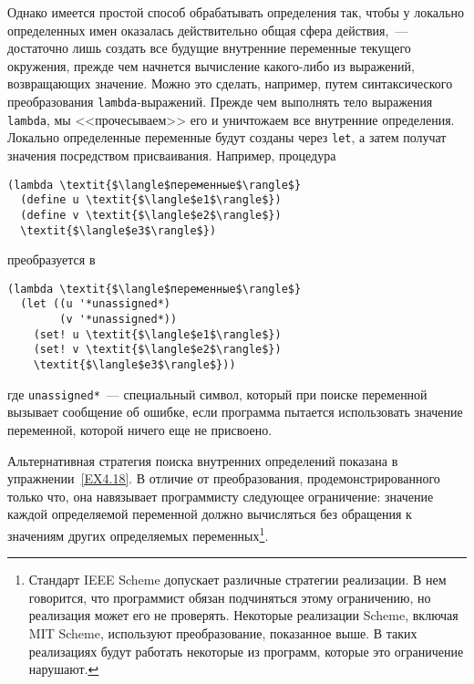 Однако имеется простой способ обрабатывать определения
так, чтобы у локально определенных имен оказалась действительно общая
сфера действия,~--- достаточно лишь создать все будущие внутренние
переменные текущего окружения, прежде чем начнется
вычисление какого-либо из выражений, возвращающих значение.  Можно это
сделать, например, путем синтаксического преобразования
{\tt lambda}-выражений.  Прежде чем выполнять тело выражения
{\tt lambda}, мы 
<<прочесываем>> его и 
уничтожаем все
внутренние определения.  Локально определенные переменные будут
созданы через {\tt let}, а затем получат значения посредством
присваивания.  Например, процедура

\begin{Verbatim}[fontsize=\small]
(lambda \textit{$\langle$переменные$\rangle$}
  (define u \textit{$\langle$e1$\rangle$})
  (define v \textit{$\langle$e2$\rangle$})
  \textit{$\langle$e3$\rangle$})
\end{Verbatim}
преобразуется в

\begin{Verbatim}[fontsize=\small]
(lambda \textit{$\langle$переменные$\rangle$}
  (let ((u '*unassigned*)
        (v '*unassigned*))
    (set! u \textit{$\langle$e1$\rangle$})
    (set! v \textit{$\langle$e2$\rangle$})
    \textit{$\langle$e3$\rangle$}))
\end{Verbatim}
где {\tt *unassigned*}~--- специальный символ, который при
поиске переменной вызывает сообщение об ошибке, если программа
пытается использовать значение переменной, которой ничего еще не
присвоено.

Альтернативная стратегия поиска внутренних определений
показана в уп\-раж\-не\-нии~\ref{EX4.18}.  В отличие от
преобразования, продемонстрированного только что, она навязывает программисту
следующее ограничение: значение каждой определяемой переменной должно 
вычисляться
без обращения к значениям других определяемых
переменных\footnote{Стандарт IEEE Scheme допускает различные стратегии
реализации. В нем говорится, что программист обязан подчиняться этому
ограничению, но реализация может его не проверять.  Некоторые
реализации Scheme, включая 
MIT Scheme, используют 
преобразование, показанное выше.  В таких
реализациях будут работать некоторые 
из программ, которые это ограничение нарушают.}.

